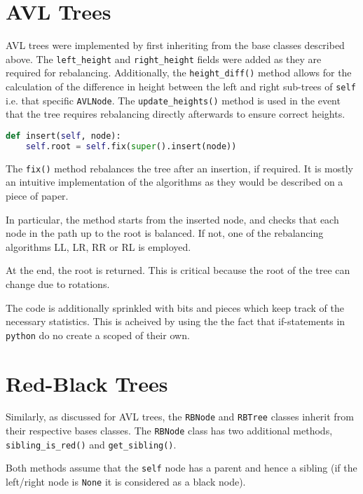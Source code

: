 \documentclass[article]{uom-coursework}
\begin{document}
\section{AVL Trees}

AVL trees were implemented by first inheriting from the base
classes described above. The \texttt{left\_height} and
\texttt{right\_height} fields were added as they are required
for rebalancing. Additionally, the \texttt{height\_diff()}
method allows for the calculation of the difference in height
between the left and right sub-trees of \texttt{self} i.e. that
specific \texttt{AVLNode}. The \texttt{update\_heights()} method
is used in the event that the tree requires rebalancing directly
afterwards to ensure correct heights.

\begin{lstlisting}[caption={The main insert function for AVL trees},language=Python]
def insert(self, node):
    self.root = self.fix(super().insert(node))
\end{lstlisting}

The \texttt{fix()} method rebalances the tree after an
insertion, if required. It is mostly an intuitive implementation
of the algorithms as they would be described on a piece of
paper.

In particular, the method starts from the inserted node, and
checks that each node in the path up to the root is balanced. If
not, one of the rebalancing algorithms LL, LR, RR or RL is
employed.

\begin{note}
At the end, the root is returned. This is critical because the
root of the tree can change due to rotations.
\end{note}

The code is additionally sprinkled with bits and pieces which
keep track of the necessary statistics. This is acheived by
using the the fact that if-statements in \texttt{python} do no
create a scoped of their own.

\section{Red-Black Trees}

Similarly, as discussed for AVL trees, the \texttt{RBNode} and
\texttt{RBTree} classes inherit from their respective bases
classes. The \texttt{RBNode} class has two additional methods,
\texttt{sibling\_is\_red()} and \texttt{get\_sibling()}.

\begin{note}
Both methods assume that the \texttt{self} node has a parent and
hence a sibling (if the left/right node is \texttt{None} it is
considered as a black node).
\end{note}
\end{document}

